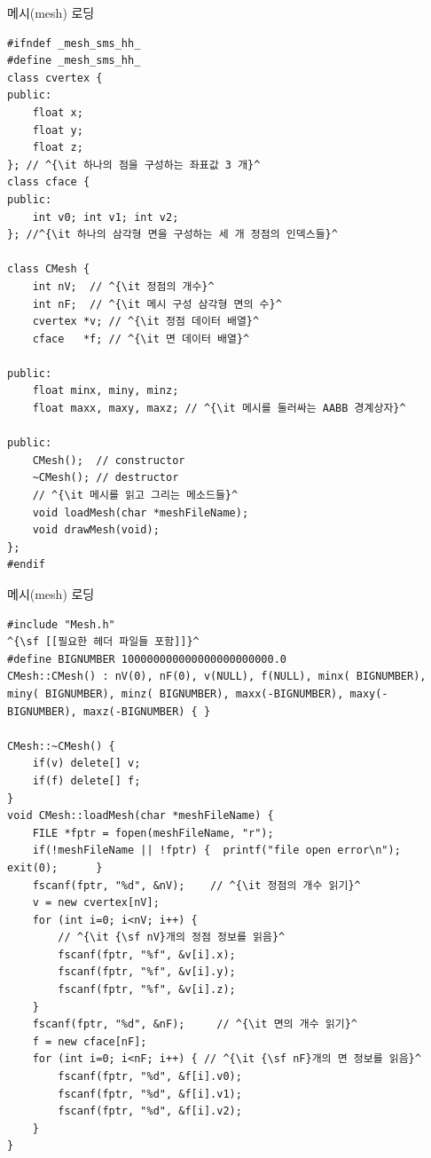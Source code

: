 \documentclass{beamer}
\begin{document}
\begin{frame}[fragile]{메시(mesh) 로딩}

\lstset{language=C++, escapechar=^} 
\begin{lstlisting}
#ifndef _mesh_sms_hh_
#define _mesh_sms_hh_
class cvertex {
public:
    float x;
    float y;
    float z;
}; // ^{\it 하나의 점을 구성하는 좌표값 3 개}^
class cface {
public:
    int v0; int v1; int v2;
}; //^{\it 하나의 삼각형 면을 구성하는 세 개 정점의 인덱스들}^

class CMesh {
    int nV;  // ^{\it 정점의 개수}^
    int nF;  // ^{\it 메시 구성 삼각형 면의 수}^
    cvertex *v; // ^{\it 정점 데이터 배열}^
    cface   *f; // ^{\it 면 데이터 배열}^

public:
    float minx, miny, minz;
    float maxx, maxy, maxz; // ^{\it 메시를 둘러싸는 AABB 경계상자}^

public:
    CMesh();  // constructor
    ~CMesh(); // destructor
    // ^{\it 메시를 읽고 그리는 메소드들}^
    void loadMesh(char *meshFileName);
    void drawMesh(void);
};
#endif
\end{lstlisting}

\end{frame}


\begin{frame}[fragile]{메시(mesh) 로딩}

\lstset{language=C++, escapechar=^} 
\begin{lstlisting}
#include "Mesh.h" 
^{\sf [[필요한 헤더 파일들 포함]]}^
#define BIGNUMBER 100000000000000000000000.0
CMesh::CMesh() : nV(0), nF(0), v(NULL), f(NULL), minx( BIGNUMBER), miny( BIGNUMBER), minz( BIGNUMBER), maxx(-BIGNUMBER), maxy(-BIGNUMBER), maxz(-BIGNUMBER) { }

CMesh::~CMesh() {
    if(v) delete[] v;
    if(f) delete[] f;    
}
void CMesh::loadMesh(char *meshFileName) {
    FILE *fptr = fopen(meshFileName, "r");
    if(!meshFileName || !fptr) {  printf("file open error\n"); exit(0);      }
    fscanf(fptr, "%d", &nV);    // ^{\it 정점의 개수 읽기}^
    v = new cvertex[nV];
    for (int i=0; i<nV; i++) {
        // ^{\it {\sf nV}개의 정점 정보를 읽음}^
        fscanf(fptr, "%f", &v[i].x); 
        fscanf(fptr, "%f", &v[i].y); 
        fscanf(fptr, "%f", &v[i].z);
    }
    fscanf(fptr, "%d", &nF);     // ^{\it 면의 개수 읽기}^
    f = new cface[nF];
    for (int i=0; i<nF; i++) { // ^{\it {\sf nF}개의 면 정보를 읽음}^        
        fscanf(fptr, "%d", &f[i].v0);   
        fscanf(fptr, "%d", &f[i].v1);    
        fscanf(fptr, "%d", &f[i].v2);
    }
}
\end{lstlisting}

\end{frame}
\end{document}
